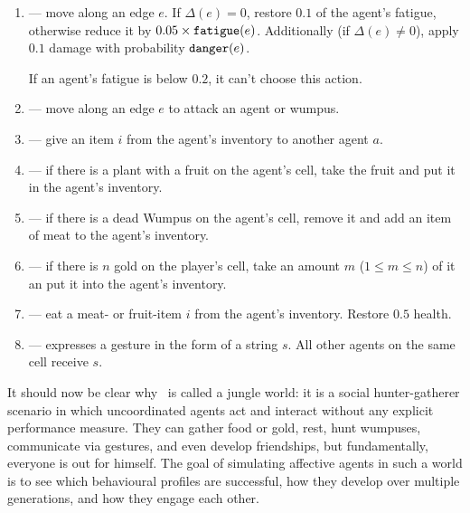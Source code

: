 \begin{definition}
\begin{description}
	\begin{enumerate}
		\item[\action{move}] --- move along an edge $e$. If $\Delta(e) = 0$, restore $0.1$ of the agent's fatigue, otherwise reduce it by $0.05 \times \mathtt{fatigue}(e)$. Additionally (if $\Delta(e) \neq 0$), apply $0.1$ damage with probability $\mathtt{danger}(e)$.
		
		If an agent's fatigue is below $0.2$, it can't choose this action.
		
		\item[\action{attack}] --- move along an edge $e$ to attack an agent or wumpus.
		
		\item[\action{give}] --- give an item $i$ from the agent's inventory to another agent $a$.
		
		\item[\action{gather}] --- if there is a plant with a fruit on the agent's cell, take the fruit and put it in the agent's inventory.
		
		\item[\action{butcher}] --- if there is a dead Wumpus on the agent's cell, remove it and add an item of meat to the agent's inventory.
		
		\item[\action{collect}] --- if there is $n$ gold on the player's cell, take an amount $m$ ($1 \leq m \leq n$) of it an put it into the agent's inventory.
		
		\item[\action{eat}] --- eat a meat- or fruit-item $i$ from the agent's inventory. Restore $0.5$ health.
		
		\item[\action{gesture}] --- expresses a gesture in the form of a string $s$. All other agents on the same cell receive $s$.
	\end{enumerate}
	
\end{description}
\end{definition}

It should now be clear why \wjun\ is called a jungle world: it is a social hunter-gatherer scenario in which uncoordinated agents act and interact without any explicit performance measure. They can gather food or gold, rest, hunt wumpuses, communicate via gestures, and even develop friendships, but fundamentally, everyone is out for himself. The goal of simulating affective agents in such a world is to see which behavioural profiles are successful, how they develop over multiple generations, and how they engage each other.

